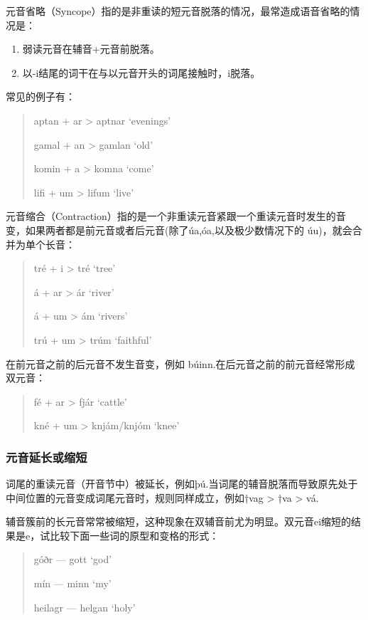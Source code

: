 元音省略（Syncope）指的是非重读的短元音脱落的情况，最常造成语音省略的情况是：

\begin{info}
  \begin{enumerate}
    \item 弱读元音在辅音+元音前脱落。
    \item 以-i结尾的词干在与以元音开头的词尾接触时，i脱落。
  \end{enumerate}
\end{info}

常见的例子有：

\begin{quote}
  aptan + ar > aptnar `evenings'

  gamal + an > gamlan `old'

  komin + a > komna `come'

  lifi + um > lifum `live'
\end{quote}

元音缩合（Contraction）指的是一个非重读元音紧跟一个重读元音时发生的音变，如果两者都是前元音或者后元音(除了úa,óa,以及极少数情况下的 úu)，就会合并为单个长音：

\begin{quote}
  tré + i > tré `tree'

  á + ar > ár `river'

  á + um > ám `rivers'

  trú + um > trúm `faithful'
\end{quote}

在前元音之前的后元音不发生音变，例如 búinn.在后元音之前的前元音经常形成双元音：

\begin{quote}
  fé + ar > fjár `cattle'

  kné + um > knjám/knjóm `knee'
\end{quote}

\subsubsection{元音延长或缩短}
\label{元音延长或缩短}

词尾的重读元音（开音节中）被延长，例如þú.当词尾的辅音脱落而导致原先处于中间位置的元音变成词尾元音时，规则同样成立，例如†vag > †va > vá.

辅音簇前的长元音常常被缩短，这种现象在双辅音前尤为明显。双元音ei缩短的结果是e，试比较下面一些词的原型和变格的形式：

\begin{quote}
  góðr --- gott `god'

  mín --- minn `my'

  heilagr --- helgan `holy'
\end{quote}

